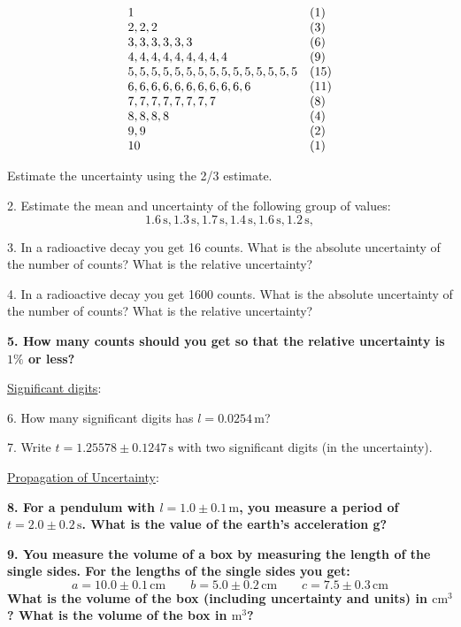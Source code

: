 $$\begin{array}{ l l }
	1 & (1)\\
	2, 2, 2 & (3)\\
	3, 3, 3, 3, 3, 3 & (6) \\
	4, 4, 4, 4, 4, 4, 4, 4, 4 & (9) \\
	5, 5, 5, 5, 5, 5, 5, 5, 5, 5, 5, 5, 5, 5, 5 & (15) \\ 
	6, 6, 6, 6, 6, 6, 6, 6, 6, 6, 6  & (11)\\
	7, 7, 7, 7, 7, 7, 7, 7 & (8) \\
	8, 8, 8, 8 & (4) \\
	9, 9 & (2) \\
	10 & (1)
\end{array}$$

Estimate the uncertainty using the 2/3 estimate. \myskip

2. Estimate the mean and uncertainty of the following group of values:
\begin{equation*}
    1.6\,\mathrm{s}, 1.3\,\mathrm{s}, 1.7\,\mathrm{s}, 1.4\,\mathrm{s}, 1.6\,\mathrm{s}, 1.2\,\mathrm{s},
\end{equation*}

3. In a radioactive decay you get 16 counts. What is the absolute uncertainty of the number of counts? What is the relative uncertainty? \myskip

4. In a radioactive decay you get 1600 counts. What is the absolute uncertainty of the number of counts? What is the relative uncertainty? \myskip

{\bf{5. How many counts should you get so that the relative uncertainty is $1\%$ or less? }}\myskip

\noindent \underline{Significant digits}: \myskip

6. How many significant digits has $l = 0.0254\,\mathrm{m}$? \myskip

7. Write $t = 1.25578 \pm 0.1247\,\mathrm{s}$ with two significant digits (in the uncertainty). \myskip

\noindent \underline{Propagation of Uncertainty}: \myskip

{\bf{8. For a pendulum with $l = 1.0 \pm 0.1\,\mathrm{m}$, you measure a period of $t = 2.0 \pm 0.2\,\mathrm{s}$. What is the value of the earth's acceleration g?}} \myskip

{\bf{9. You measure the volume of a box by measuring the length of the single sides. For the lengths of the single sides you get:
\begin{equation*}
    a = 10.0 \pm 0.1\,\mathrm{cm}\qquad    b = 5.0 \pm 0.2\,\mathrm{cm} \qquad c = 7.5 \pm 0.3\,\mathrm{cm}
\end{equation*}
What is the volume of the box (including uncertainty and units) in $\mathrm{cm}^3$? What is the volume of the box in $\mathrm{m}^3$? }}\myskip

